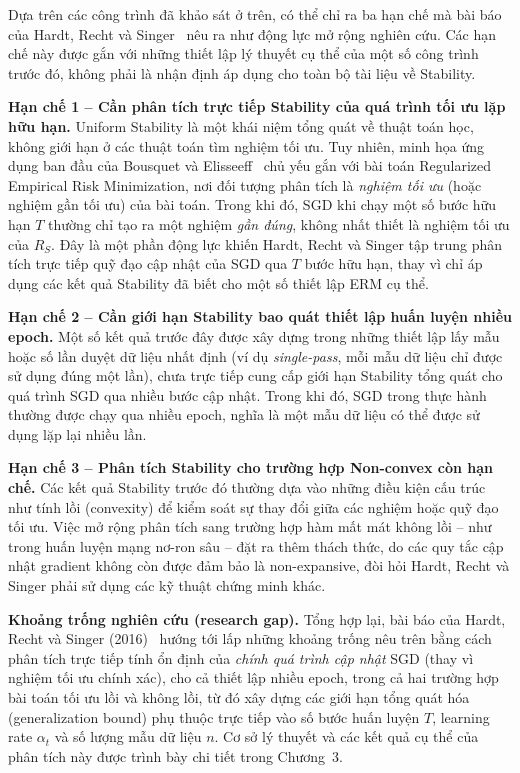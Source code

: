 Dựa trên các công trình đã khảo sát ở trên, có thể chỉ ra ba hạn chế mà bài báo của Hardt, Recht và Singer~\cite{hardt2016train} nêu ra như động lực mở rộng nghiên cứu. Các hạn chế này được gắn với những thiết lập lý thuyết cụ thể của một số công trình trước đó, không phải là nhận định áp dụng cho toàn bộ tài liệu về Stability.

\textbf{Hạn chế 1 -- Cần phân tích trực tiếp Stability của quá trình tối ưu lặp hữu hạn.} Uniform Stability là một khái niệm tổng quát về thuật toán học, không giới hạn ở các thuật toán tìm nghiệm tối ưu. Tuy nhiên, minh họa ứng dụng ban đầu của Bousquet và Elisseeff~\cite{bousquet2002stability} chủ yếu gắn với bài toán Regularized Empirical Risk Minimization, nơi đối tượng phân tích là \emph{nghiệm tối ưu} (hoặc nghiệm gần tối ưu) của bài toán. Trong khi đó, SGD khi chạy một số bước hữu hạn $T$ thường chỉ tạo ra một nghiệm \emph{gần đúng}, không nhất thiết là nghiệm tối ưu của $R_S$. Đây là một phần động lực khiến Hardt, Recht và Singer tập trung phân tích trực tiếp quỹ đạo cập nhật của SGD qua $T$ bước hữu hạn, thay vì chỉ áp dụng các kết quả Stability đã biết cho một số thiết lập ERM cụ thể.

\textbf{Hạn chế 2 -- Cần giới hạn Stability bao quát thiết lập huấn luyện nhiều epoch.} Một số kết quả trước đây được xây dựng trong những thiết lập lấy mẫu hoặc số lần duyệt dữ liệu nhất định (ví dụ \textit{single-pass}, mỗi mẫu dữ liệu chỉ được sử dụng đúng một lần), chưa trực tiếp cung cấp giới hạn Stability tổng quát cho quá trình SGD qua nhiều bước cập nhật. Trong khi đó, SGD trong thực hành thường được chạy qua nhiều epoch, nghĩa là một mẫu dữ liệu có thể được sử dụng lặp lại nhiều lần.

\textbf{Hạn chế 3 -- Phân tích Stability cho trường hợp Non-convex còn hạn chế.} Các kết quả Stability trước đó thường dựa vào những điều kiện cấu trúc như tính lồi (convexity) để kiểm soát sự thay đổi giữa các nghiệm hoặc quỹ đạo tối ưu. Việc mở rộng phân tích sang trường hợp hàm mất mát không lồi -- như trong huấn luyện mạng nơ-ron sâu -- đặt ra thêm thách thức, do các quy tắc cập nhật gradient không còn được đảm bảo là non-expansive, đòi hỏi Hardt, Recht và Singer phải sử dụng các kỹ thuật chứng minh khác.

\textbf{Khoảng trống nghiên cứu (research gap).} Tổng hợp lại, bài báo của Hardt, Recht và Singer (2016)~\cite{hardt2016train} hướng tới lấp những khoảng trống nêu trên bằng cách phân tích trực tiếp tính ổn định của \emph{chính quá trình cập nhật} SGD (thay vì nghiệm tối ưu chính xác), cho cả thiết lập nhiều epoch, trong cả hai trường hợp bài toán tối ưu lồi và không lồi, từ đó xây dựng các giới hạn tổng quát hóa (generalization bound) phụ thuộc trực tiếp vào số bước huấn luyện $T$, learning rate $\alpha_t$ và số lượng mẫu dữ liệu $n$. Cơ sở lý thuyết và các kết quả cụ thể của phân tích này được trình bày chi tiết trong Chương~3.
